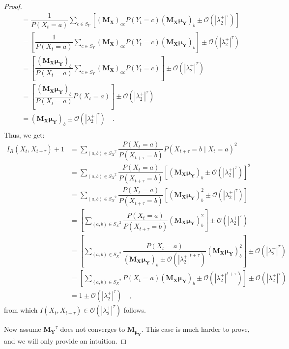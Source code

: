 \documentclass[../../main.tex]{subfiles}
\begin{document}
\begin{proof}
\begin{align*}
            &= \dfrac{1}{P(X_t = a)} \sum_{c \in S_Y} \left[ (\bm{M_X})_{ac} P(Y_t = c) (\bm{M_X}\bm{\mu_Y})_{b} \pm \mathcal{O}(|\lambda_2^+|^\tau) \right] \\
            &= \left[ \dfrac{1}{P(X_t = a)} \sum_{c \in S_Y} (\bm{M_X})_{ac} P(Y_t = c) (\bm{M_X}\bm{\mu_Y})_{b} \right] \pm \mathcal{O}(|\lambda_2^+|^\tau) \\
            &= \left[ \dfrac{(\bm{M_X}\bm{\mu_Y})_{b}}{P(X_t = a)} \sum_{c \in S_Y} (\bm{M_X})_{ac} P(Y_t = c) \right] \pm \mathcal{O}(|\lambda_2^+|^\tau) \\
            &= \left[ \dfrac{(\bm{M_X}\bm{\mu_Y})_{b}}{P(X_t = a)} P(X_t = a) \right] \pm \mathcal{O}(|\lambda_2^+|^\tau) \\
            &= (\bm{M_X}\bm{\mu_Y})_{b} \pm \mathcal{O}(|\lambda_2^+|^\tau) \quad . \\
        \end{align*}
        Thus, we get:
        \begin{align*}
            I_R(X_t, X_{t + \tau}) + 1 &= \sum_{(a,b) \in {S_X}^2} \dfrac{P(X_t = a)}{P(X_{t + \tau} = b)} P(X_{t + \tau} = b \mid X_t = a)^2 \\
            &= \sum_{(a,b) \in {S_X}^2} \dfrac{P(X_t = a)}{P(X_{t + \tau} = b)} \left[ (\bm{M_X}\bm{\mu_Y})_{b} \pm \mathcal{O}(|\lambda_2^+|^\tau) \right] ^2 \\
            &= \sum_{(a,b) \in {S_X}^2} \dfrac{P(X_t = a)}{P(X_{t + \tau} = b)} \left[ (\bm{M_X}\bm{\mu_Y})_{b}^2 \pm \mathcal{O}(|\lambda_2^+|^\tau) \right] \\
            &= \left[ \sum_{(a,b) \in {S_X}^2} \dfrac{P(X_t = a)}{P(X_{t + \tau} = b)} (\bm{M_X}\bm{\mu_Y})_{b}^2 \right] \pm \mathcal{O}(|\lambda_2^+|^\tau) \\
            &= \left[ \sum_{(a,b) \in {S_X}^2} \dfrac{P(X_t = a)}{(\bm{M_X}\bm{\mu_Y})_{b} \pm \mathcal{O}(|\lambda_2^+|^{t + \tau})} (\bm{M_X}\bm{\mu_Y})_{b}^2 \right] \pm \mathcal{O}(|\lambda_2^+|^\tau) \\
            &= \left[ \sum_{(a,b) \in {S_X}^2} P(X_t = a)(\bm{M_X}\bm{\mu_Y})_{b} \pm \mathcal{O}(|\lambda_2^+|^{t + \tau}) \right] \pm \mathcal{O}(|\lambda_2^+|^\tau) \\
            &= 1 \pm \mathcal{O}(|\lambda_2^+|^\tau) \quad ,
        \end{align*}
        from which $I(X_t, X_{t + \tau}) \in \mathcal{O}(|\lambda_2^+|^\tau)$ follows.

        Now assume $\bm{M_Y}^\tau$ does not converges to $\bm{M_{\mu_Y}}$. This case is much harder to prove, and we will only provide an intuition.
        

\end{proof}
\end{document}
